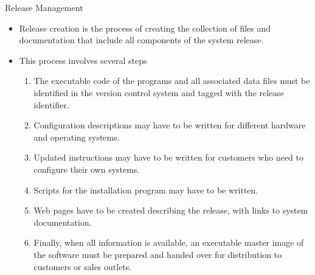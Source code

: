 \documentclass{beamer}
\begin{document}
\begin{frame}{Release Management}
	\begin{itemize}
		\item Release creation is the process of creating the collection of files and documentation that include all 
		components of the system release.
		\item This process involves several steps
		\begin{enumerate}
			\item The executable code of the programs and all associated data files must be identified in the version 
			control system and tagged with the release identifier.
			\item Configuration descriptions may have to be written for different hardware and operating systems.
			\item Updated instructions may have to be written for customers who need to configure their own 
			systems.
			\item Scripts for the installation program may have to be written.
			\item Web pages have to be created describing the release, with links to system documentation.
			\item Finally, when all information is available, an executable master image of the software must be 
			prepared and handed over for distribution to customers or sales outlets.
		\end{enumerate}
	\end{itemize}
\end{frame}
\end{document}
